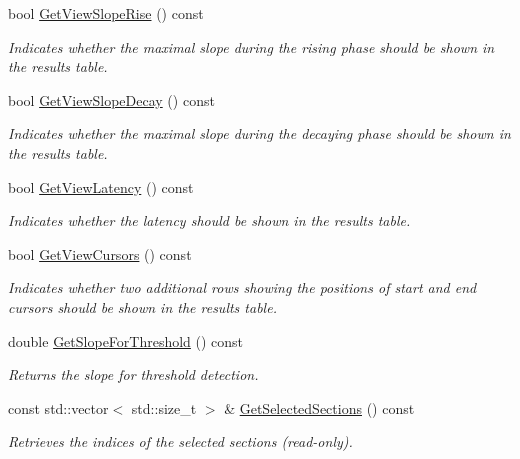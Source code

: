 \begin{DoxyCompactItemize}
bool \hyperlink{classRecording_ae53c53b07e3adf52dda7188de8d73d90}{GetViewSlopeRise} () const 
\begin{DoxyCompactList}\small\item\em Indicates whether the maximal slope during the rising phase should be shown in the results table. \item\end{DoxyCompactList}\item 
bool \hyperlink{classRecording_a17b74a0a77c8f5bfa1c8fcf4d2ba2aeb}{GetViewSlopeDecay} () const 
\begin{DoxyCompactList}\small\item\em Indicates whether the maximal slope during the decaying phase should be shown in the results table. \item\end{DoxyCompactList}\item 
bool \hyperlink{classRecording_ac66d5645dfa48cd435a1aa0e13441acf}{GetViewLatency} () const 
\begin{DoxyCompactList}\small\item\em Indicates whether the latency should be shown in the results table. \item\end{DoxyCompactList}\item 
bool \hyperlink{classRecording_a77f66796e5a0f92f85dbf51fb26dd80f}{GetViewCursors} () const 
\begin{DoxyCompactList}\small\item\em Indicates whether two additional rows showing the positions of start and end cursors should be shown in the results table. \item\end{DoxyCompactList}\item 
double \hyperlink{classRecording_ab776755e157228affa10ed03a64a861d}{GetSlopeForThreshold} () const 
\begin{DoxyCompactList}\small\item\em Returns the slope for threshold detection. \item\end{DoxyCompactList}\item 
const std::vector$<$ std::size\_\-t $>$ \& \hyperlink{classRecording_a63be379d83bafd2a4d7be0f79999536c}{GetSelectedSections} () const 
\begin{DoxyCompactList}\small\item\em Retrieves the indices of the selected sections (read-\/only). \item\end{DoxyCompactList}\item 

\end{DoxyCompactItemize}
